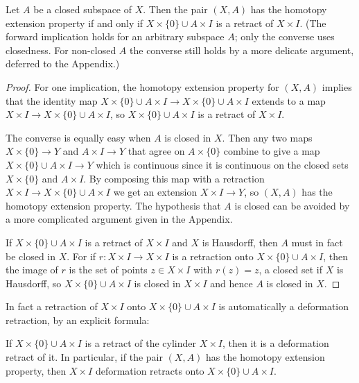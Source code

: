 \begin{proposition}
\label{prop:hep-iff-retract}
\leanok
{}
Let $A$ be a closed subspace of $X$. Then the pair $(X,A)$ has the homotopy
extension property if and only if $X \times \{0\} \cup A \times I$ is a retract of
$X \times I$. (The forward implication holds for an arbitrary subspace $A$; only
the converse uses closedness. For non-closed $A$ the converse still holds by a
more delicate argument, deferred to the Appendix.)
\end{proposition}

\begin{proof}
\leanok
For one implication, the homotopy extension property for $(X,A)$ implies that the
identity map $X \times \{0\} \cup A \times I \to X \times \{0\} \cup A \times I$ extends to a map
$X \times I \to X \times \{0\} \cup A \times I$, so $X \times \{0\} \cup A \times I$ is a retract of $X \times I$.

The converse is equally easy when $A$ is closed in $X$. Then any two maps
$X \times \{0\} \to Y$ and $A \times I \to Y$ that agree on $A \times \{0\}$ combine to give a map
$X \times \{0\} \cup A \times I \to Y$ which is continuous since it is continuous on the closed
sets $X \times \{0\}$ and $A \times I$. By composing this map with a retraction
$X \times I \to X \times \{0\} \cup A \times I$ we get an extension $X \times I \to Y$, so $(X,A)$ has
the homotopy extension property. The hypothesis that $A$ is closed can be avoided by
a more complicated argument given in the Appendix.

If $X \times \{0\} \cup A \times I$ is a retract of $X \times I$ and $X$ is Hausdorff, then $A$ must
in fact be closed in $X$. For if $r : X \times I \to X \times I$ is a retraction onto
$X \times \{0\} \cup A \times I$, then the image of $r$ is the set of points $z \in X \times I$ with
$r(z) = z$, a closed set if $X$ is Hausdorff, so $X \times \{0\} \cup A \times I$ is closed in
$X \times I$ and hence $A$ is closed in $X$.
\end{proof}

In fact a retraction of $X \times I$ onto $X \times \{0\} \cup A \times I$ is automatically a
deformation retraction, by an explicit formula:

\begin{lemma}
\label{lem:hep-cylinder-deformation-retract}
\leanok
{}
If $X \times \{0\} \cup A \times I$ is a retract of the cylinder $X \times I$, then it is a
deformation retract of it. In particular, if the pair $(X,A)$ has the homotopy
extension property, then $X \times I$ deformation retracts onto
$X \times \{0\} \cup A \times I$.
\end{lemma}


